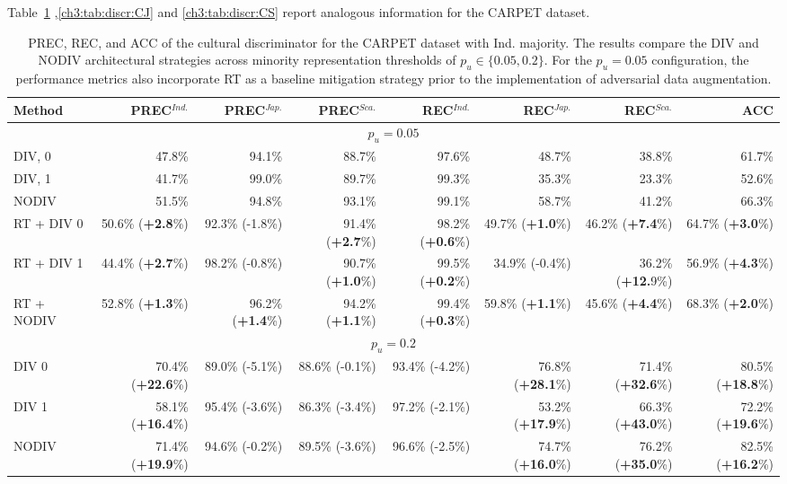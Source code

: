 %
Table~\ref{ch3:tab:discr:CI} ,\ref{ch3:tab:discr:CJ} and \ref{ch3:tab:discr:CS} report analogous information for the CARPET dataset.
%
\begin{table}
\centering
\scriptsize
\setlength{\tabcolsep}{0.1cm}
\begin{tabular}{lrrrrrrr}
\toprule
\textbf{Method} & \textbf{PREC}$^{Ind.}$  & \textbf{PREC}$^{Jap.}$ & \textbf{PREC}$^{Sca.}$ & \textbf{REC}$^{Ind.}$ & \textbf{REC}$^{Jap.}$ & \textbf{REC}$^{Sca.}$ &  \textbf{ACC}\\
\midrule
\multicolumn{8}{c}{$p_u=0.05$} \\
\midrule
DIV, 0 & 47.8\%&	94.1\%&	88.7\%&	97.6\%&	48.7\%&	38.8\%&	61.7\%\\
DIV, 1 & 41.7\%&	99.0\%&	89.7\%&	99.3\%&	35.3\%&	23.3\%	&	52.6\%\\
NODIV & 51.5\%&	94.8\%&	93.1\%&	99.1\%&	58.7\%&	41.2\%	&	66.3\%\\
\midrule
RT + DIV 0      & 50.6\% (\textbf{+2.8}\%) & 92.3\% (-1.8\%) & 91.4\% (\textbf{+2.7}\%) & 98.2\% (\textbf{+0.6}\%) & 49.7\% (\textbf{+1.0}\%) & 46.2\% (\textbf{+7.4}\%) & 64.7\% (\textbf{+3.0}\%) \\
RT + DIV 1      & 44.4\% (\textbf{+2.7}\%) & 98.2\% (-0.8\%) & 90.7\% (\textbf{+1.0}\%) & 99.5\% (\textbf{+0.2}\%) & 34.9\% (-0.4\%) & 36.2\% (\textbf{+12.}9\%) & 56.9\% (\textbf{+4.3}\%) \\
RT + NODIV      & 52.8\% (\textbf{+1.3}\%) & 96.2\% (\textbf{+1.4}\%) & 94.2\% (\textbf{+1.1}\%) & 99.4\% (\textbf{+0.3}\%) & 59.8\% (\textbf{+1.1}\%) & 45.6\% (\textbf{+4.4}\%) & 68.3\% (\textbf{+2.0}\%) \\
\midrule
\multicolumn{8}{c}{$p_u=0.2$} \\
\midrule
DIV 0           & 70.4\% (\textbf{+22.6}\%) & 89.0\% (-5.1\%) & 88.6\% (-0.1\%) & 93.4\% (-4.2\%) & 76.8\% (\textbf{+28.1}\%) & 71.4\% (\textbf{+32.6}\%) & 80.5\% (\textbf{+18.8}\%) \\
DIV 1           & 58.1\% (\textbf{+16.4}\%) & 95.4\% (-3.6\%) & 86.3\% (-3.4\%) & 97.2\% (-2.1\%) & 53.2\% (\textbf{+17.9}\%) & 66.3\% (\textbf{+43.0}\%) & 72.2\% (\textbf{+19.6}\%) \\
NODIV           & 71.4\% (\textbf{+19.9}\%) & 94.6\% (-0.2\%) & 89.5\% (-3.6\%) & 96.6\% (-2.5\%) & 74.7\% (\textbf{+16.0}\%) & 76.2\% (\textbf{+35.0}\%) & 82.5\% (\textbf{+16.2}\%) \\
\bottomrule
\end{tabular}
\caption{PREC, REC, and ACC of the cultural discriminator for the CARPET dataset with Ind. majority. The results compare the DIV and NODIV architectural strategies across minority representation thresholds of $p_u \in \{0.05, 0.2\}$. For the $p_u = 0.05$ configuration, the performance metrics also incorporate RT as a baseline mitigation strategy prior to the implementation of adversarial data augmentation.}
\label{ch3:tab:discr:CI}
\end{table}
